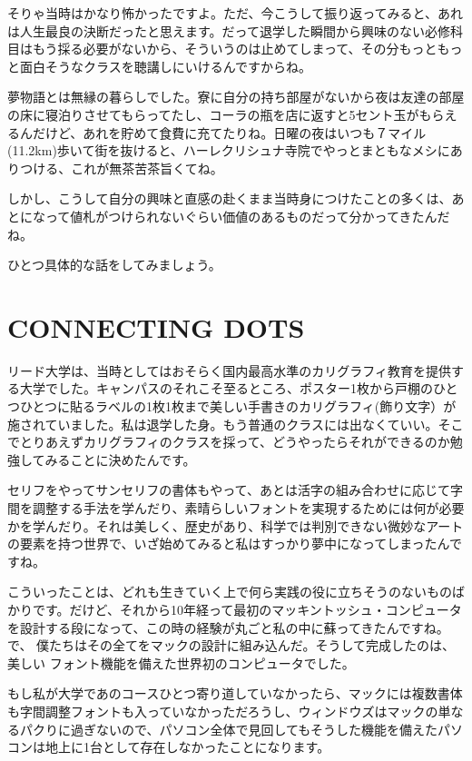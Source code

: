 \documentclass[a4paper,11pt,twocolumn]{jarticle}
\begin{document}
そりゃ当時はかなり怖かったですよ。ただ、今こうして振り返ってみると、あれ
は人生最良の決断だったと思えます。だって退学した瞬間から興味のない必修科
目はもう採る必要がないから、そういうのは止めてしまって、その分もっともっ
と面白そうなクラスを聴講しにいけるんですからね。

夢物語とは無縁の暮らしでした。寮に自分の持ち部屋がないから夜は友達の部屋
の床に寝泊りさせてもらってたし、コーラの瓶を店に返すと5セント玉がもらえ
るんだけど、あれを貯めて食費に充てたりね。日曜の夜はいつも７マイル
(11.2km)歩いて街を抜けると、ハーレクリシュナ寺院でやっとまともなメシにあ
りつける、これが無茶苦茶旨くてね。

しかし、こうして自分の興味と直感の赴くまま当時身につけたことの多くは、あ
とになって値札がつけられないぐらい価値のあるものだって分かってきたんだね。

ひとつ具体的な話をしてみましょう。


\section{CONNECTING DOTS}

リード大学は、当時としてはおそらく国内最高水準のカリグラフィ教育を提供す
る大学でした。キャンパスのそれこそ至るところ、ポスター1枚から戸棚のひと
つひとつに貼るラベルの1枚1枚まで美しい手書きのカリグラフィ(飾り文字）が
施されていました。私は退学した身。もう普通のクラスには出なくていい。そこ
でとりあえずカリグラフィのクラスを採って、どうやったらそれができるのか勉
強してみることに決めたんです。

セリフをやってサンセリフの書体もやって、あとは活字の組み合わせに応じて字
間を調整する手法を学んだり、素晴らしいフォントを実現するためには何が必要
かを学んだり。それは美しく、歴史があり、科学では判別できない微妙なアート
の要素を持つ世界で、いざ始めてみると私はすっかり夢中になってしまったんで
すね。

こういったことは、どれも生きていく上で何ら実践の役に立ちそうのないものば
かりです。だけど、それから10年経って最初のマッキントッシュ・コンピュータ
を設計する段になって、この時の経験が丸ごと私の中に蘇ってきたんですね。で、
僕たちはその全てをマックの設計に組み込んだ。そうして完成したのは、美しい
フォント機能を備えた世界初のコンピュータでした。

もし私が大学であのコースひとつ寄り道していなかったら、マックには複数書体
も字間調整フォントも入っていなかっただろうし、ウィンドウズはマックの単な
るパクりに過ぎないので、パソコン全体で見回してもそうした機能を備えたパソ
コンは地上に1台として存在しなかったことになります。
\end{document}
